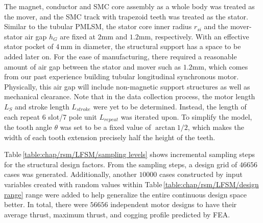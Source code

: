             
            The magnet, conductor and \acs{SMC} core assembly as a whole body was treated as the mover, and the \acs{SMC} track with trapezoid teeth was treated as the stator. Similar to the tubular \acs{PMLSM}, the stator core inner radius $r_{si}$ and the mover-stator air gap $h_G$ are fixed at $2\mathrm{mm}$ and $1.2\mathrm{mm}$, respectively. With an effective stator pocket of $4\,\mathrm{mm}$ in diameter, the structural support has a space to be added later on. For the ease of manufacturing, there required a reasonable amount of air gap between the stator and mover such as $1.2\mathrm{mm}$, which comes from our past experience building tubular longitudinal synchronous motor. Physically, this air gap will include non-magnetic support structures as well as mechanical clearance. Note that in the data collection process, the motor length $L_S$ and stroke length $L_{stroke}$ were yet to be determined. Instead, the length of each repeat 6 slot/7 pole unit $L_{repeat}$ was iterated upon. To simplify the model, the tooth angle $\theta$ was set to be a fixed value of $\arctan{1/2}$, which makes the width of each tooth extension precisely half the height of the teeth.
            
            
            Table\,\ref{table:chap/rsm/LFSM/sampling levels} shows incremental sampling steps for the structural design factors. From the sampling steps, a design grid of $46656$ cases was generated. Additionally, another $10000$ cases constructed by input variables created with random values within Table\,\ref{table:chap/rsm/LFSM/design range} range were added to help generalize the entire continuous design space better. In total, there were $56656$ independent motor designs to have their average thrust, maximum thrust, and cogging profile predicted by \acs{FEA}.
            
